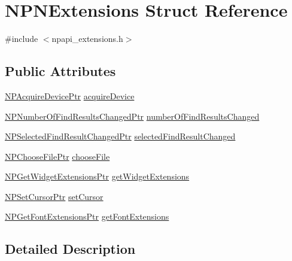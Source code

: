 \hypertarget{struct_n_p_n_extensions}{
\section{NPNExtensions Struct Reference}
\label{struct_n_p_n_extensions}
}


{\ttfamily \#include $<$npapi\_\-extensions.h$>$}

\subsection*{Public Attributes}
\begin{DoxyCompactItemize}
\item 
\hyperlink{npapi__extensions_8h_a718039334715c01ec9d651fab6873762}{NPAcquireDevicePtr} \hyperlink{struct_n_p_n_extensions_aac32128f303a0affff3f9ee28834d643}{acquireDevice}
\item 
\hyperlink{npapi__extensions_8h_a669d08b972f7ac19bfb551f575940803}{NPNumberOfFindResultsChangedPtr} \hyperlink{struct_n_p_n_extensions_ad74b140a965a2dbade0cd188e3585d29}{numberOfFindResultsChanged}
\item 
\hyperlink{npapi__extensions_8h_a1b4c4cc3146e0723b7f0c0d5189b9200}{NPSelectedFindResultChangedPtr} \hyperlink{struct_n_p_n_extensions_aa1be39296fd71b183738a876c59bc4a9}{selectedFindResultChanged}
\item 
\hyperlink{npapi__extensions_8h_a0ab0de5413eb4d975ac9a22df04d9909}{NPChooseFilePtr} \hyperlink{struct_n_p_n_extensions_a76ad1f3f35ed05ae67ab266ee8ca74d8}{chooseFile}
\item 
\hyperlink{npapi__extensions_8h_a953f27eab35003c42c2caabbf8ea6603}{NPGetWidgetExtensionsPtr} \hyperlink{struct_n_p_n_extensions_ac03f0c4046b3419a575dfe1bb3d79e0a}{getWidgetExtensions}
\item 
\hyperlink{npapi__extensions_8h_a21eebf919613dec3d7790905d9bd1dd8}{NPSetCursorPtr} \hyperlink{struct_n_p_n_extensions_a9e7532a93dcb451d4591b263dd7a42c3}{setCursor}
\item 
\hyperlink{npapi__extensions_8h_a4df1919745f7f62ef1710b25f14dd9ac}{NPGetFontExtensionsPtr} \hyperlink{struct_n_p_n_extensions_a0bd6f792efd096c2e3ae79b5a11f5d90}{getFontExtensions}
\end{DoxyCompactItemize}


\subsection{Detailed Description}


